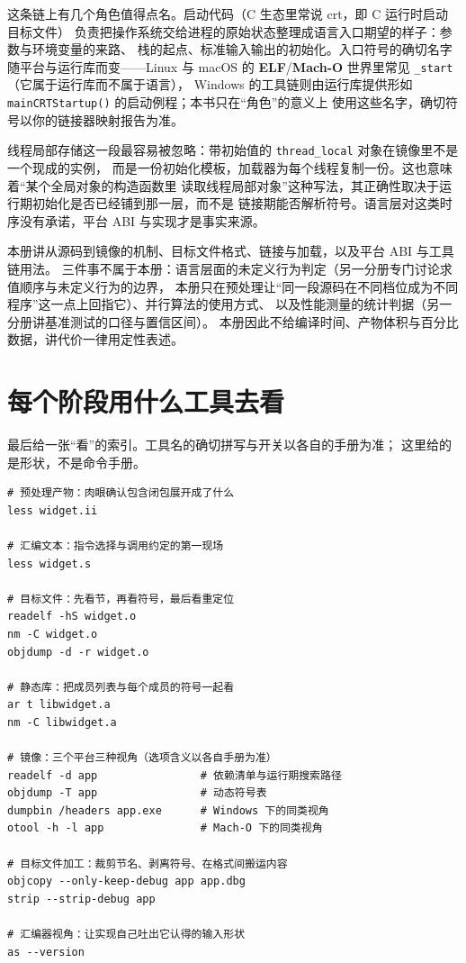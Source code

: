 \documentclass[12pt,a4paper,fontset=fandol]{ctexbook}
\newcommand{\Fn}[1]{\texttt{#1()}}
\newcommand{\Tp}[1]{\texttt{#1}}
\newcommand{\Lang}[1]{\textsf{#1}}
\newcommand{\CL}{\Lang{C}}
\newcommand{\Sym}[1]{\texttt{#1}}
\newcommand{\Mx}[1]{\textsf{#1}}
\newcommand{\Elf}{\textbf{\textsf{ELF}}}
\newcommand{\Macho}{\textbf{\textsf{Mach-O}}}
\newcommand{\Nix}{\textsf{Linux}}
\newcommand{\Win}{\textsf{Windows}}
\newcommand{\Mac}{\textsf{macOS}}
\begin{document}
这条链上有几个角色值得点名。启动代码（\CL{} 生态里常说 \Mx{crt}，即 C 运行时启动目标文件）
负责把操作系统交给进程的原始状态整理成语言入口期望的样子：参数与环境变量的来路、
栈的起点、标准输入输出的初始化。入口符号的确切名字随平台与运行库而变——\Nix{} 与
\Mac{} 的 \Elf{}/\Macho{} 世界里常见 \Sym{\_start}（它属于运行库而不属于语言），
\Win{} 的工具链则由运行库提供形如 \Fn{mainCRTStartup} 的启动例程；本书只在“角色”的意义上
使用这些名字，确切符号以你的链接器映射报告为准。

线程局部存储这一段最容易被忽略：带初始值的 \Tp{thread\_local} 对象在镜像里不是一个现成的实例，
而是一份初始化模板，加载器为每个线程复制一份。这也意味着“某个全局对象的构造函数里
读取线程局部对象”这种写法，其正确性取决于运行期初始化是否已经铺到那一层，而不是
链接期能否解析符号。语言层对这类时序没有承诺，平台 ABI 与实现才是事实来源。

\begin{note}[title={本册范围声明}]
本册讲从源码到镜像的机制、目标文件格式、链接与加载，以及平台 ABI 与工具链用法。
三件事不属于本册：语言层面的未定义行为判定（另一分册专门讨论求值顺序与未定义行为的边界，
本册只在预处理让“同一段源码在不同档位成为不同程序”这一点上回指它）、并行算法的使用方式、
以及性能测量的统计判据（另一分册讲基准测试的口径与置信区间）。
本册因此不给编译时间、产物体积与百分比数据，讲代价一律用定性表述。
\end{note}

\section{每个阶段用什么工具去看}\label{sec:cl01-viewing}

最后给一张“看”的索引。工具名的确切拼写与开关以各自的手册为准；
这里给的是形状，不是命令手册。

\begin{lstlisting}[style=shellstyle,language=ShellCL,caption={各阶段产物用只读工具查看的形状}]
# 预处理产物：肉眼确认包含闭包展开成了什么
less widget.ii

# 汇编文本：指令选择与调用约定的第一现场
less widget.s

# 目标文件：先看节，再看符号，最后看重定位
readelf -hS widget.o
nm -C widget.o
objdump -d -r widget.o

# 静态库：把成员列表与每个成员的符号一起看
ar t libwidget.a
nm -C libwidget.a

# 镜像：三个平台三种视角（选项含义以各自手册为准）
readelf -d app                # 依赖清单与运行期搜索路径
objdump -T app                # 动态符号表
dumpbin /headers app.exe      # Windows 下的同类视角
otool -h -l app               # Mach-O 下的同类视角

# 目标文件加工：裁剪节名、剥离符号、在格式间搬运内容
objcopy --only-keep-debug app app.dbg
strip --strip-debug app

# 汇编器视角：让实现自己吐出它认得的输入形状
as --version
\end{lstlisting}
\end{document}
